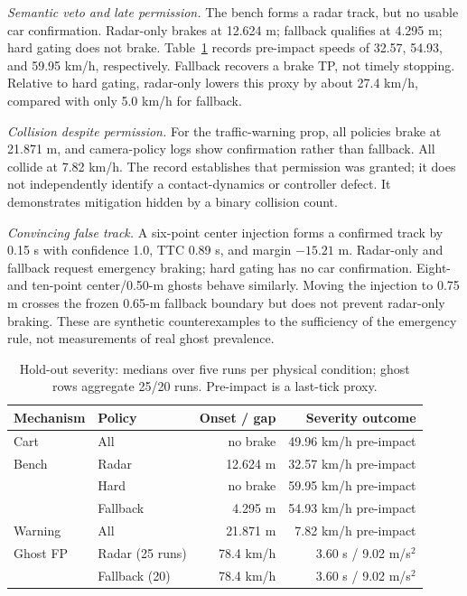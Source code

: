\documentclass[conference]{IEEEtran}
\begin{document}
\emph{Semantic veto and late permission.} The bench forms a radar track, but no
usable car confirmation. Radar-only brakes at 12.624 m; fallback qualifies at
4.295 m; hard gating does not brake. Table~\ref{tab:severity} records pre-impact
speeds of 32.57, 54.93, and 59.95 km/h, respectively. Fallback recovers a brake
TP, not timely stopping. Relative to hard gating, radar-only lowers this proxy
by about 27.4 km/h, compared with only 5.0 km/h for fallback.

\emph{Collision despite permission.} For the traffic-warning prop, all policies
brake at 21.871 m, and camera-policy logs show confirmation rather than fallback.
All collide at 7.82 km/h. The record establishes that permission was granted;
it does not independently identify a contact-dynamics or controller defect.
It demonstrates mitigation hidden by a binary collision count.

\emph{Convincing false track.} A six-point center injection forms a confirmed
track by 0.15 s with confidence 1.0, TTC 0.89 s, and margin $-15.21$ m.
Radar-only and fallback request emergency braking; hard gating has no car
confirmation. Eight- and ten-point center/0.50-m ghosts behave similarly.
Moving the injection to 0.75 m crosses the frozen 0.65-m fallback boundary but
does not prevent radar-only braking. These are synthetic counterexamples to the
sufficiency of the emergency rule, not measurements of real ghost prevalence.

\begin{table}[t]
\caption{Hold-out severity: medians over five runs per physical condition; ghost rows aggregate 25/20 runs. Pre-impact is a last-tick proxy.}
\label{tab:severity}
\centering\scriptsize
\setlength{\tabcolsep}{3pt}
\begin{tabular}{llrr}
\toprule Mechanism & Policy & Onset / gap & Severity outcome\\ \midrule
Cart & All & no brake & 49.96 km/h pre-impact\\
Bench & Radar & 12.624 m & 32.57 km/h pre-impact\\
 & Hard & no brake & 59.95 km/h pre-impact\\
 & Fallback & 4.295 m & 54.93 km/h pre-impact\\
Warning & All & 21.871 m & 7.82 km/h pre-impact\\
\midrule
Ghost FP & Radar (25 runs) & 78.4 km/h & 3.60 s / 9.02 m/s$^2$\\
 & Fallback (20) & 78.4 km/h & 3.60 s / 9.02 m/s$^2$\\
\bottomrule
\end{tabular}
\end{table}
\end{document}
